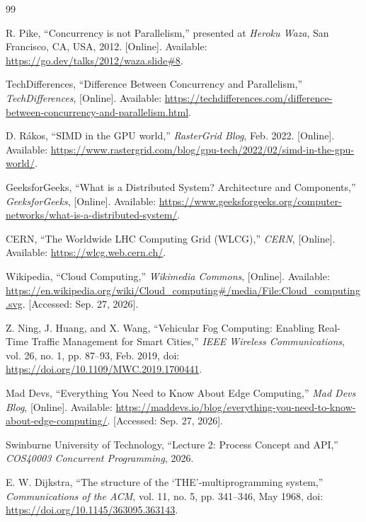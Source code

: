 \documentclass[11pt,a4paper]{article}
\begin{document}
\begin{thebibliography}{99}
\raggedright

R. Pike, ``Concurrency is not Parallelism,'' presented at \emph{Heroku Waza}, San Francisco, CA, USA, 2012. [Online]. Available: \url{https://go.dev/talks/2012/waza.slide#8}. 

TechDifferences, ``Difference Between Concurrency and Parallelism,'' \emph{TechDifferences}, [Online]. Available: \url{https://techdifferences.com/difference-between-concurrency-and-parallelism.html}. 

D. Rákos, ``SIMD in the GPU world,'' \emph{RasterGrid Blog}, Feb. 2022. [Online]. Available: \url{https://www.rastergrid.com/blog/gpu-tech/2022/02/simd-in-the-gpu-world/}. 

GeeksforGeeks, ``What is a Distributed System? Architecture and Components,'' \emph{GeeksforGeeks}, [Online]. Available: \url{https://www.geeksforgeeks.org/computer-networks/what-is-a-distributed-system/}. 

CERN, ``The Worldwide LHC Computing Grid (WLCG),'' \emph{CERN}, [Online]. Available: \url{https://wlcg.web.cern.ch/}. 

Wikipedia, ``Cloud Computing,'' \emph{Wikimedia Commons}, [Online]. Available: \url{https://en.wikipedia.org/wiki/Cloud_computing#/media/File:Cloud_computing.svg}. [Accessed: Sep. 27, 2026].

Z. Ning, J. Huang, and X. Wang, ``Vehicular Fog Computing: Enabling Real-Time Traffic Management for Smart Cities,'' \emph{IEEE Wireless Communications}, vol. 26, no. 1, pp. 87--93, Feb. 2019, doi: \url{https://doi.org/10.1109/MWC.2019.1700441}.

Mad Devs, ``Everything You Need to Know About Edge Computing,'' \emph{Mad Devs Blog}, [Online]. Available: \url{https://maddevs.io/blog/everything-you-need-to-know-about-edge-computing/}. [Accessed: Sep. 27, 2026].

Swinburne University of Technology, ``Lecture 2: Process Concept and API,'' \emph{COS40003 Concurrent Programming}, 2026.

E. W. Dijkstra, ``The structure of the `THE'-multiprogramming system,'' \emph{Communications of the ACM}, vol. 11, no. 5, pp. 341--346, May 1968, doi: \url{https://doi.org/10.1145/363095.363143}.

\end{thebibliography}
\end{document}
